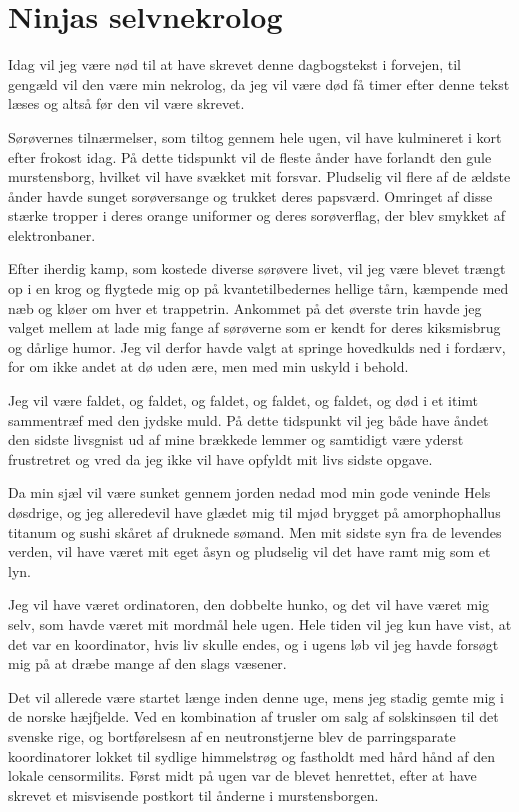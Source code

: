 \begin{minipage}[t]{150mm}
\vspace{3mm}
\section*{Ninjas selvnekrolog}
Idag vil jeg være nød til at have skrevet denne dagbogstekst i forvejen, til gengæld vil den være min nekrolog, da jeg vil være død få timer efter denne tekst læses og altså før den vil være skrevet.

Sørøvernes tilnærmelser, som tiltog gennem hele ugen, vil have kulmineret i kort efter frokost idag. På dette tidspunkt vil de fleste ånder have forlandt den gule murstensborg, hvilket vil have svækket mit forsvar. Pludselig vil flere af de ældste ånder havde sunget sorøversange og trukket deres papsværd. Omringet af disse stærke tropper i deres orange uniformer og deres sorøverflag, der blev smykket af elektronbaner. 

Efter iherdig kamp, som kostede diverse sørøvere livet, vil jeg være blevet trængt op i en krog og flygtede mig op på kvantetilbedernes hellige tårn, kæmpende med næb og kløer om hver et trappetrin. Ankommet på det øverste trin havde jeg valget mellem at lade mig fange af sørøverne som er kendt for deres kiksmisbrug og dårlige humor. Jeg vil derfor havde valgt at springe hovedkulds ned i fordærv, for om ikke andet at dø uden ære, men med min uskyld i behold.

Jeg vil være faldet, og faldet, og faldet, og faldet, og faldet, og død i et itimt sammentræf med den jydske 
muld. På dette tidspunkt vil jeg både have åndet den sidste livsgnist ud af mine brækkede lemmer og samtidigt være yderst frustretret og vred da jeg ikke vil have opfyldt mit livs sidste opgave. 

Da min sjæl vil være sunket gennem jorden nedad mod min gode veninde Hels døsdrige, og jeg alleredevil have  glædet mig til mjød brygget på amorphophallus titanum og sushi skåret af druknede sømand. Men mit sidste syn fra de levendes verden, vil have været mit eget åsyn og pludselig vil det have ramt mig som et lyn.

Jeg vil have været ordinatoren, den dobbelte hunko, og det vil have været mig selv, som havde været mit mordmål hele ugen. Hele tiden vil jeg kun have vist, at det var en koordinator, hvis liv skulle endes, og i ugens løb vil jeg havde forsøgt mig på at dræbe mange af den slags væsener.

Det vil allerede være startet længe inden denne uge, mens jeg stadig gemte mig i de norske hæjfjelde. Ved en kombination af trusler om salg af solskinsøen til det svenske rige, og bortførelsesn af en neutronstjerne blev de parringsparate koordinatorer lokket til sydlige himmelstrøg og fastholdt med hård hånd af den lokale censormilits. Først midt på ugen var de blevet henrettet, efter at have skrevet et misvisende postkort til ånderne i murstensborgen.


\end{minipage}

